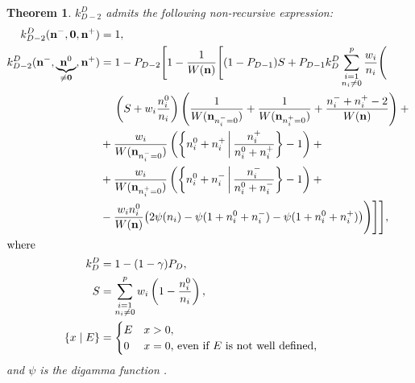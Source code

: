 \documentclass[a4paper]{article}
\newtheorem{theorem}{Theorem}
\theoremstyle{definition}
\begin{document}
    \begin{theorem}
        \label{th:depth2}
        $k^D_{D-2}$ admits the following non-recursive expression:
        \newcommand{\somespace}{\hspace{-6ex}}
        \begin{align}
            k^D_{D-2}(\mathbf n^-, \mathbf 0, \mathbf n^+) &= 1, \\
            k^D_{D-2}(\mathbf n^-,
                      \underbrace{\mathbf n^0}_{\mathclap{{}\ne \mathbf 0}},
                      \mathbf n^+) &=
            1 - P_{D-2} \Bigg[1 - \frac 1 {W(\mathbf n)} \Bigg[
                (1 - P_{D-1}) S +
                P_{D-1} k^D_D
                \sum_{\substack{i=1 \\ n_i \ne0}}^p \frac {w_i} {n_i} \Bigg( \notag \\
                    & \phantom{{}+{}}
                    \left(S + w_i \frac {n^0_i} {n_i}\right)
                    \left(
                        \frac 1 {W(\mathbf n_{n^-_i=0})} +
                        \frac 1 {W(\mathbf n_{n^+_i=0})} +
                        \frac {n^-_i + n^+_i - 2} {W(\mathbf n)}
                    \right)
                    + {} \notag \\
                    & {} +
                    \frac {w_i} {W(\mathbf n_{n^-_i=0})}
                    \left(\left\{
                        n^0_i + n^+_i
                        \,\middle|\,
                        \frac {n^+_i} {n^0_i + n^+_i}
                    \right\} - 1\right) + {} \notag \\
                    & {} +
                    \frac {w_i} {W(\mathbf n_{n^+_i=0})}
                    \left(\left\{
                        n^0_i + n^-_i
                        \,\middle|\,
                        \frac {n^-_i} {n^0_i + n^-_i}
                    \right\} - 1\right)
                    + {} \notag \\
                    & {} -
                    \frac {w_i n^0_i} {W(\mathbf n)}
                    \big(
                        2\psi(n_i) -
                        \psi(1 + n^0_i + n^-_i) -
                        \psi(1 + n^0_i + n^+_i)
                    \big)
            \Bigg)\Bigg]\Bigg], \label{eq:depth2} \\
            \intertext{where}
            k^D_D &= 1 - (1 - \gamma) P_D, \\
            S &= \sum_{\substack{i=1 \\n_i \ne 0}}^p
            w_i \left(1 - \frac{n^0_i} {n_i} \right), \\
            \{ x \mid E \} &= \begin{cases}
                E & x > 0, \\
                0 & \text{$x = 0$, even if $E$ is not well defined,}
            \end{cases}
        \end{align}
        and $\psi$ is the digamma function \autocite[\S5.15]{dlmf}.
    \end{theorem}
\end{document}
